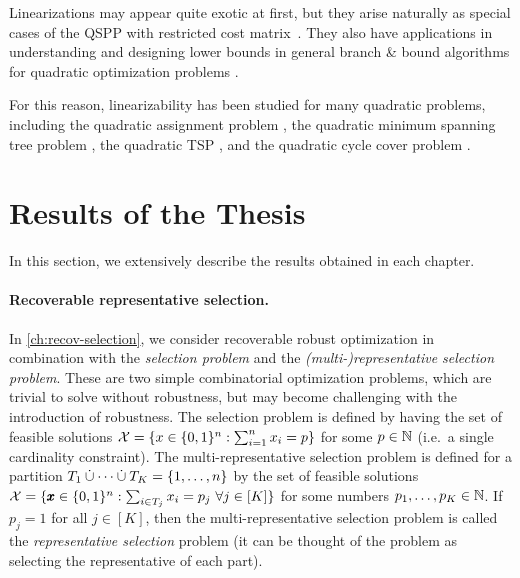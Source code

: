 Linearizations may appear quite exotic at first, but they arise naturally as special cases of the QSPP with restricted cost matrix~\cite{huSo2018}. They also have applications in understanding and designing lower bounds in general branch \& bound algorithms for quadratic optimization problems \cite{huSo2021}. 

For this reason, linearizability has been studied for many quadratic problems, including the quadratic assignment problem
 \cite{CeDeWo2016,Erdogan2006,ErTa2007,ErTa2011,kabadi2011n,punnen2013linear,waddellcharacterizing}, 
 the quadratic minimum spanning tree problem \cite{CuPu2018,sotirov2021quadratic},   the quadratic TSP \cite{PuWaWo2017}, and  the quadratic cycle cover problem \cite{deMeSo2020}.  


\section{Results of the Thesis}
\label{sec:thesis-results}

In this section, we extensively describe the results obtained in each chapter.

\paragraph*{Recoverable representative selection.}
In \cref{ch:recov-selection}, we consider recoverable robust optimization in combination with the \emph{selection problem} and the \emph{(multi-)representative selection problem}. 
These are two simple combinatorial optimization problems, which are trivial to solve without robustness, but may become challenging with the introduction of robustness. 
The selection problem is defined by having the set of feasible solutions $\mathcal{X} = \{ x \in \{ 0,1 \}^n : \sum_{i=1}^n x_i = p \}$ for some $p \in \mathbb{N}$ (i.e.\ a single cardinality constraint). 
The multi-representative selection problem is defined for a partition $T_1 \dotunion \dots \dotunion T_K = \fromto{1}{n}$ by the set of feasible solutions $\mathcal{X} = \{  \pmb{x}\in \{0,1\}^n : \sum_{i\in T_j} x_i = p_j\ \forall j \in [K]  \}$ for some numbers $p_1,\dots,p_K \in \mathbb{N}$. If $p_j = 1$ for all $j \in [K]$, then the multi-representative selection problem is called the \emph{representative selection} problem (it can be thought of the problem as selecting the representative of each part).

